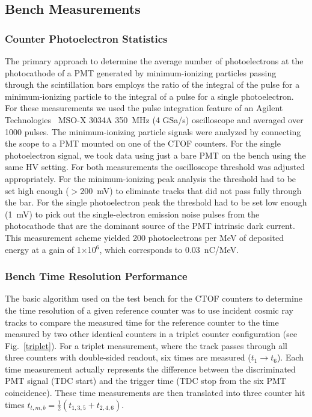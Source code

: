 \documentclass{elsart}
\begin{document}
\subsection{Bench Measurements}
\label{sec:bench}

\subsubsection{Counter Photoelectron Statistics}
\label{sec:npe}

The primary approach to determine the average number of photoelectrons at the photocathode of a PMT
generated by minimum-ionizing particles passing through the scintillation bars employs the ratio of the
integral of the pulse for a minimum-ionizing particle to the integral of a pulse for a single photoelectron.
For these measurements we used the pulse integration feature of an Agilent Technologies~\cite{agilent-ref}
MSO-X 3034A 350~MHz (4 GSa/s) oscilloscope and averaged over 1000 pulses. The minimum-ionizing particle
signals were analyzed by connecting the scope to a PMT mounted on one of the CTOF counters. For the single
photoelectron signal, we took data using just a bare PMT on the bench using the same HV setting. For both
measurements the oscilloscope threshold was adjusted appropriately. For the minimum-ionizing peak analysis
the threshold had to be set high enough ($>$200~mV) to eliminate tracks that did not pass fully through the
bar. For the single photoelectron peak the threshold had to be set low enough (1~mV) to pick out the
single-electron emission noise pulses from the photocathode that are the dominant source of the PMT
intrinsic dark current. This measurement scheme yielded 200 photoelectrons per MeV of deposited energy
at a gain of 1$\times$10$^6$, which corresponds to 0.03~nC/MeV.

\subsubsection{Bench Time Resolution Performance}
\label{sec-bench}

The basic algorithm used on the test bench for the CTOF counters to determine the time resolution of
a given reference counter was to use incident cosmic ray tracks to compare the measured time
for the reference counter to the time measured by two other identical counters in a triplet counter
configuration (see Fig.~\ref{triplet}). For a triplet measurement, where the track passes through all
three counters with double-sided readout, six times are measured ($t_1 \to t_6$). Each time measurement
actually represents the difference between the discriminated PMT signal (TDC start) and the trigger time
(TDC stop from the six PMT coincidence). These time measurements are then translated into three counter
hit times $t_{t,m,b} = \frac{1}{2}(t_{1,3,5} + t_{2,4,6})$.
\end{document}
